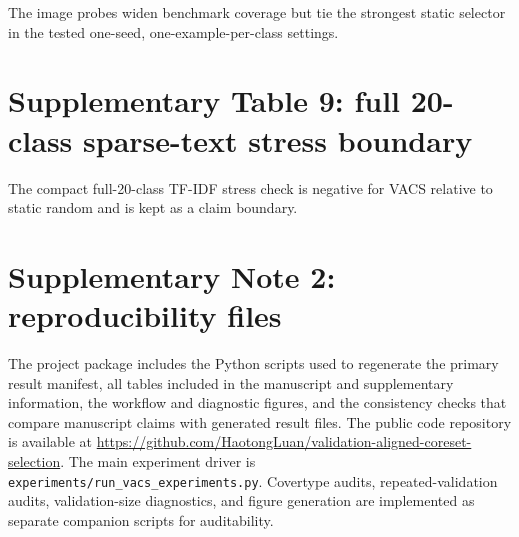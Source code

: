 \documentclass[12pt]{article}
\begin{document}
The image probes widen benchmark coverage but tie the strongest static selector in the tested one-seed, one-example-per-class settings.

\begin{center}
\small
\resizebox{0.80\linewidth}{!}{}
\end{center}

\begin{center}
\small
\resizebox{0.80\linewidth}{!}{}
\end{center}

\section*{Supplementary Table 9: full 20-class sparse-text stress boundary}

The compact full-20-class TF-IDF stress check is negative for VACS relative to static random and is kept as a claim boundary.

\begin{center}
\small
\resizebox{0.90\linewidth}{!}{}
\end{center}

\section*{Supplementary Note 2: reproducibility files}

The project package includes the Python scripts used to regenerate the primary result manifest, all tables included in the manuscript and supplementary information, the workflow and diagnostic figures, and the consistency checks that compare manuscript claims with generated result files. The public code repository is available at \url{https://github.com/HaotongLuan/validation-aligned-coreset-selection}. The main experiment driver is \texttt{experiments/run\_vacs\_experiments.py}. Covertype audits, repeated-validation audits, validation-size diagnostics, and figure generation are implemented as separate companion scripts for auditability.
\end{document}
